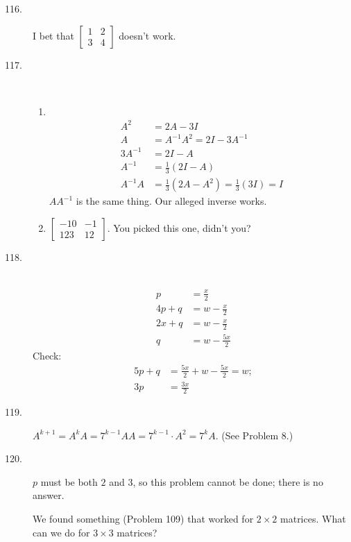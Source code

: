 \documentclass{article}
\begin{document}
\begin{description}
  \item[116.] I bet that $\begin{bmatrix} 1 & 2 \\ 3 & 4 \end{bmatrix}$ doesn't work.

  \item[117.] $\ $
    \begin{enumerate}[\hspace{1cm}(a)]
      \item $\ $
        \begin{align*}
        A^2 & = 2A - 3I \\
        A & = A^{-1} A^2 = 2I - 3A^{-1} \\
        3A^{-1} & = 2I - A \\
        A^{-1} & = \frac{1}{3} (2I - A) \\
        A^{-1} A & = \frac{1}{3} (2A - A^2) = \frac{1}{3} (3I) = I
        \end{align*}
        $A A^{-1}$ is the same thing. Our alleged inverse works.
      \item $\begin{bmatrix} -10 & -1 \\ 123 & 12 \end{bmatrix}$. You picked this one, didn't you?
    \end{enumerate}

  \item[118.] $\ $
    \begin{align*}
         p & = \frac{x}{2} \\
    4p + q & = w - \frac{x}{2} \\
    2x + q & = w - \frac{x}{2} \\
         q & = w - \frac{5x}{2}
    \end{align*}
    Check: 
    \begin{align*}
    5p + q & = \frac{5x}{2} + w - \frac{5x}{2} = w; \\
    3p & = \frac{3x}{2}
    \end{align*}

  \item[119.] $A^{k+1} = A^k A = 7^{k-1} AA = 7^{k-1} \cdot A^2 = 7^k A$. (See Problem 8.)

  \item[120.] $p$ must be both $2$ and $3$, so this problem cannot be done; there is no answer.

    We found something (Problem 109) that worked for $2 \times 2$ matrices. What can we do for $3 \times 3$ matrices?


\end{description}
\end{document}
